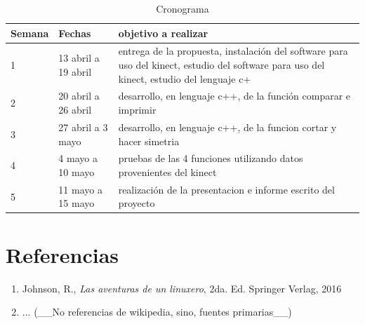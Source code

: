 \documentclass[letterpaper]{article}
\begin{document}
\begin{table}
\begin{tabular}{l l l}
\toprule
\textbf{Semana} & \textbf{Fechas} & \textbf{objetivo a realizar}\\
\midrule
1 & 13 abril a 19 abril & entrega de la propuesta, instalación del
software para uso del kinect, estudio del software para uso del kinect,
estudio del lenguaje c+ \\
2 & 20 abril a 26 abril & desarrollo, en lenguaje c++, de la función
comparar e imprimir \\
3 & 27 abril a 3 mayo & desarrollo, en lenguaje c++, de la funcion
cortar y hacer simetria \\
4 & 4 mayo a 10 mayo & pruebas de las 4 funciones utilizando datos
provenientes del kinect \\
5 & 11 mayo a 15 mayo & realización de la presentacion e informe
escrito del proyecto \\
\bottomrule
\end{tabular}
\caption{Cronograma}
\end{table}

\section{Referencias}

\begin{enumerate}
\item Johnson, R., \textit{Las aventuras de un linuxero}, 2da. Ed. Springer Verlag, 2016
\item ... (\_\_No referencias de wikipedia, sino, fuentes primarias\_\_)
\end{enumerate}
	
\end{document}
